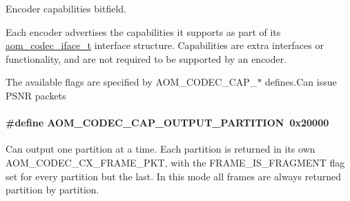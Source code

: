 Encoder capabilities bitfield. 

Each encoder advertises the capabilities it supports as part of its \hyperlink{group__codec_ga4ef55b44c762836d1550e11921bed403}{aom\+\_\+codec\+\_\+iface\+\_\+t} interface structure. Capabilities are extra interfaces or functionality, and are not required to be supported by an encoder.

The available flags are specified by A\+O\+M\+\_\+\+C\+O\+D\+E\+C\+\_\+\+C\+A\+P\+\_\+$\ast$ defines.\+Can issue P\+S\+NR packets 
\paragraph[{\texorpdfstring{A\+O\+M\+\_\+\+C\+O\+D\+E\+C\+\_\+\+C\+A\+P\+\_\+\+O\+U\+T\+P\+U\+T\+\_\+\+P\+A\+R\+T\+I\+T\+I\+ON}{AOM_CODEC_CAP_OUTPUT_PARTITION}}]{\setlength{\rightskip}{0pt plus 5cm}\#define A\+O\+M\+\_\+\+C\+O\+D\+E\+C\+\_\+\+C\+A\+P\+\_\+\+O\+U\+T\+P\+U\+T\+\_\+\+P\+A\+R\+T\+I\+T\+I\+ON~0x20000}\hypertarget{group__encoder_gaffe0534e52a635dab200dad2456b9336}{}\label{group__encoder_gaffe0534e52a635dab200dad2456b9336}
Can output one partition at a time. Each partition is returned in its own A\+O\+M\+\_\+\+C\+O\+D\+E\+C\+\_\+\+C\+X\+\_\+\+F\+R\+A\+M\+E\+\_\+\+P\+KT, with the F\+R\+A\+M\+E\+\_\+\+I\+S\+\_\+\+F\+R\+A\+G\+M\+E\+NT flag set for every partition but the last. In this mode all frames are always returned partition by partition. 
